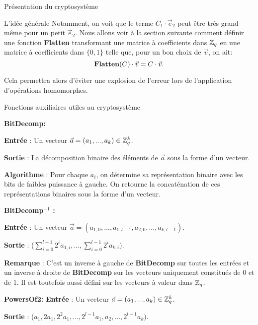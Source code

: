 \begin{section}{Présentation du cryptosystème}
\begin{subsection}{L'idée générale}
	Notamment, on voit que le terme $C_1 \cdot\vec{e}_2$ peut être très grand
	même pour un petit $\vec{e}_2$. Nous allons voir à la section suivante
	comment définir une fonction \textbf{Flatten} transformant une matrice
	à coefficients dans $\mathbb{Z}_q$ en une matrice à coefficients dans $\{0, 1\}$
	telle que, pour un bon choix de $\vec{v}$, on ait:
	\[ \text{\textbf{Flatten}}(C)\cdot\vec{v} = C\cdot\vec{v}.\]

	Cela permettra alors d'éviter une explosion de l'erreur lors de
	l'application d'opérations homomorphes. 
	\end{subsection}
	\begin{subsection}{Fonctions auxiliaires utiles au cryptosystème}

\vspace{0.5cm}\noindent\textbf{BitDecomp:}
\flushleft

	\textbf{Entrée} : Un vecteur $\vec{a} = (a_1, ..., a_k) \in \mathbb{Z}_q^{k}$.

	\textbf{Sortie} : La décomposition binaire des éléments de $\vec{a}$ sous la forme d'un vecteur.

	\textbf{Algorithme} : Pour chaque $a_i$, on détermine sa représentation binaire avec les bits de faibles
	puissance à gauche. On retourne la concaténation de ces représentations binaires sous la forme d'un vecteur.
	
\vspace{0.5cm}\noindent\textbf{BitDecomp$^{-1}$ :}
\flushleft

	\textbf{Entrée} : Un vecteur $\vec{a} = (a_{1,0}, ..., a_{1,l-1}, a_{2,0}, ..., a_{k,l-1})$.

	\textbf{Sortie} :  ($\sum\limits_{i=0}^{l-1} 2^{i} a_{1,i}, ..., \sum\limits_{i=0}^{l-1} 2^{i} a_{k,i})$.

	\textbf{Remarque} : C'est un inverse à gauche de \textbf{BitDecomp} sur toutes les entrées et un inverse à droite de
	\textbf{BitDecomp} sur les vecteurs uniquement constitués de $0$ et de $1$. Il est toutefois aussi défini sur
	les vecteurs à valeur dans $\mathbb{Z}_q$.

\begin{samepage} %

\vspace{0.5cm}\noindent\textbf{PowersOf2:}
\flushleft
	\textbf{Entrée} : Un vecteur $\vec{a} = (a_1, ..., a_k) \in \mathbb{Z}_q^{k}$.

	\textbf{Sortie} : ($a_1, 2 a_1, 2^{2} a_1, ..., 2^{l-1} a_1, a_2, ..., 2^{l-1} a_k)$.
\end{samepage}	


\end{subsection}
\end{section}
